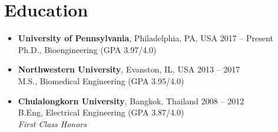 \section{\sc Education}

\begin{itemize}[leftmargin=0cm, label={}]

\item {\bf University of Pennsylvania}, Philadelphia, PA, USA \hfill 2017 -- Present \\
Ph.D., Bioengineering \hfill (GPA 3.97/4.0)

\item {\bf Northwestern University}, Evanston, IL, USA \hfill 2013 -- 2017 \\
M.S., Biomedical Engineering \hfill (GPA 3.95/4.0)

\item {\bf Chulalongkorn University}, Bangkok, Thailand \hfill 2008 -- 2012 \\
B.Eng, Electrical Engineering \hfill (GPA 3.87/4.0)\\
{\em First Class Honors}

\end{itemize}
